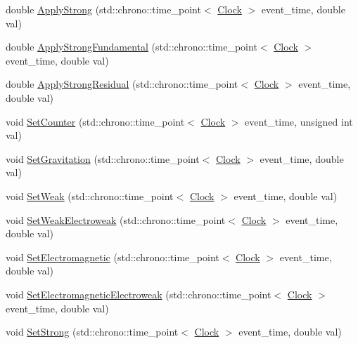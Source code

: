 \begin{DoxyCompactItemize}
double \hyperlink{class_composite_force_particle_ac1464a04fbbca2d8927dfdbef0429878}{Apply\+Strong} (std\+::chrono\+::time\+\_\+point$<$ \hyperlink{universe_8h_a0ef8d951d1ca5ab3cfaf7ab4c7a6fd80}{Clock} $>$ event\+\_\+time, double val)
\item 
double \hyperlink{class_composite_force_particle_a64fe19ee12d6ca0a69f650faa5bedb58}{Apply\+Strong\+Fundamental} (std\+::chrono\+::time\+\_\+point$<$ \hyperlink{universe_8h_a0ef8d951d1ca5ab3cfaf7ab4c7a6fd80}{Clock} $>$ event\+\_\+time, double val)
\item 
double \hyperlink{class_composite_force_particle_ae0937405e68dd40b19036d5a359f7e07}{Apply\+Strong\+Residual} (std\+::chrono\+::time\+\_\+point$<$ \hyperlink{universe_8h_a0ef8d951d1ca5ab3cfaf7ab4c7a6fd80}{Clock} $>$ event\+\_\+time, double val)
\item 
void \hyperlink{class_composite_force_particle_a41cee6bd5a75fbf67fa6e76a9e7d7605}{Set\+Counter} (std\+::chrono\+::time\+\_\+point$<$ \hyperlink{universe_8h_a0ef8d951d1ca5ab3cfaf7ab4c7a6fd80}{Clock} $>$ event\+\_\+time, unsigned int val)
\item 
void \hyperlink{class_composite_force_particle_ad9e1553ab0096230edd591e3135b223d}{Set\+Gravitation} (std\+::chrono\+::time\+\_\+point$<$ \hyperlink{universe_8h_a0ef8d951d1ca5ab3cfaf7ab4c7a6fd80}{Clock} $>$ event\+\_\+time, double val)
\item 
void \hyperlink{class_composite_force_particle_a7899a6efda98b062051e37c25c214e2a}{Set\+Weak} (std\+::chrono\+::time\+\_\+point$<$ \hyperlink{universe_8h_a0ef8d951d1ca5ab3cfaf7ab4c7a6fd80}{Clock} $>$ event\+\_\+time, double val)
\item 
void \hyperlink{class_composite_force_particle_a73a3792ae1c334e74f945fea56083f0b}{Set\+Weak\+Electroweak} (std\+::chrono\+::time\+\_\+point$<$ \hyperlink{universe_8h_a0ef8d951d1ca5ab3cfaf7ab4c7a6fd80}{Clock} $>$ event\+\_\+time, double val)
\item 
void \hyperlink{class_composite_force_particle_a476c0d570c3be75c9e186df1ec2a5cda}{Set\+Electromagnetic} (std\+::chrono\+::time\+\_\+point$<$ \hyperlink{universe_8h_a0ef8d951d1ca5ab3cfaf7ab4c7a6fd80}{Clock} $>$ event\+\_\+time, double val)
\item 
void \hyperlink{class_composite_force_particle_ad53c5d396b3c56241174a9bd78f9e07a}{Set\+Electromagnetic\+Electroweak} (std\+::chrono\+::time\+\_\+point$<$ \hyperlink{universe_8h_a0ef8d951d1ca5ab3cfaf7ab4c7a6fd80}{Clock} $>$ event\+\_\+time, double val)
\item 
void \hyperlink{class_composite_force_particle_a06488ef0457335648b161d3ed746b643}{Set\+Strong} (std\+::chrono\+::time\+\_\+point$<$ \hyperlink{universe_8h_a0ef8d951d1ca5ab3cfaf7ab4c7a6fd80}{Clock} $>$ event\+\_\+time, double val)

\end{DoxyCompactItemize}
